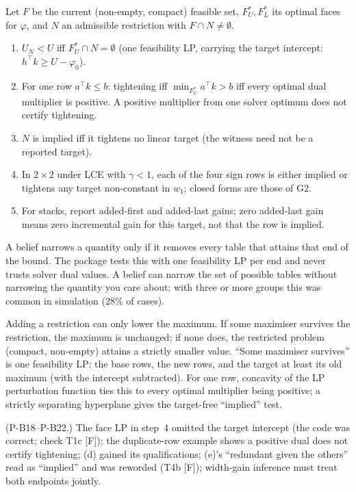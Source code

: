 \begin{result}\label{res:r2}
 Let $F$ be the current (non-empty, compact) feasible set,
$F^*_U,F^*_L$ its optimal faces for $\varphi$, and $N$ an admissible restriction
with $F\cap N\ne\emptyset$.
\begin{enumerate}[label=(\alph*),nosep]
\item $U_N<U$ iff $F^*_U\cap N=\emptyset$ (one feasibility LP, carrying the
target intercept: $h^\top k\ge U-\varphi_0$).
\item For one row $a^\top k\le b$: tightening iff $\min_{F^*_U}a^\top k>b$ iff
every optimal dual multiplier is positive. A positive multiplier from one solver
optimum does not certify tightening.
\item $N$ is implied iff it tightens no linear target (the witness need not be a
reported target).
\item In $2\times2$ under LCE with $\gamma<1$, each of the four sign rows is either
implied or tightens any target non-constant in $w_1$; closed forms are those of G2.
\item For stacks, report added-first and added-last gains; zero added-last gain
means zero incremental gain for this target, not that the row is implied.
\end{enumerate}
\end{result}
\begin{plain}
A belief narrows a quantity only if it removes every table that attains that end
of the bound. The package tests this with one feasibility LP per end and never
trusts solver dual values. A belief can narrow the set of possible tables without
narrowing the quantity you care about; with three or more groups this was common
in simulation (28\% of cases).
\end{plain}
\begin{sketch}
Adding a restriction can only lower the maximum. If some maximiser survives the
restriction, the maximum is unchanged; if none does, the restricted problem
(compact, non-empty) attains a strictly smaller value. ``Some maximiser
survives'' is one feasibility LP: the base rows, the new rows, and the target at
least its old maximum (with the intercept subtracted). For one row, concavity of
the LP perturbation function ties this to every optimal multiplier being
positive; a strictly separating hyperplane gives the target-free ``implied''
test.
\end{sketch}
\begin{revnote}
(P-B18--P-B22.) The face LP in step~4 omitted the target intercept (the code
was correct; check T1c [F]); the duplicate-row example shows a positive dual does
not certify tightening; (d) gained its qualifications; (e)'s ``redundant given
the others'' read as ``implied'' and was reworded (T4b [F]); width-gain
inference must treat both endpoints jointly.
\end{revnote}

